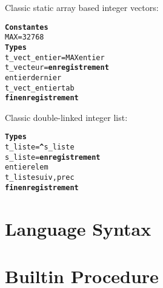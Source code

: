 \documentclass[a4paper, pdftex, 12pt]{article}
\begin{document}
Classic static array based integer vectors:
\begin{alltt}
\textbf{Constantes}
  MAX = 32768
\textbf{Types}
  t_vect_entier = MAX entier
  t_vecteur = \textbf{enregistrement}
    entier              dernier
    t_vect_entier       tab
  \textbf{fin enregistrement}
\end{alltt}

\noindent Classic double-linked integer list:
\begin{alltt}
\textbf{Types}
  t_liste = \textbf{^}s_liste
  s_liste = \textbf{enregistrement}
    entier              elem
    t_liste             suiv, prec
  \textbf{fin enregistrement}
\end{alltt}

\section{Language Syntax}
\label{sec:syntax}

\section{Builtin Procedure}
\label{sec:builtin}
\end{document}

